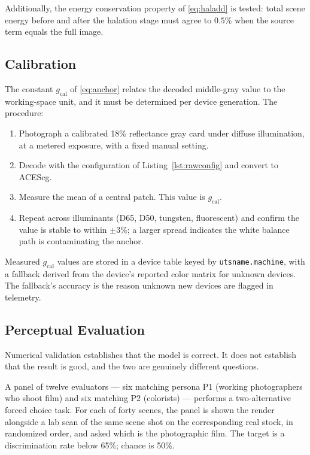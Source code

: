 Additionally, the energy conservation property of \eqref{eq:haladd} is tested:
total scene energy before and after the halation stage must agree to $0.5\%$
when the source term equals the full image.

\subsection{Calibration}
\label{sec:calibration}

The constant $g_{\mathrm{cal}}$ of \eqref{eq:anchor} relates the decoded
middle-gray value to the working-space unit, and it must be determined per
device generation. The procedure:

\begin{enumerate}
\item Photograph a calibrated 18\% reflectance gray card under diffuse
illumination, at a metered exposure, with a fixed manual setting.
\item Decode with the configuration of Listing~\ref{lst:rawconfig} and convert
to ACEScg.
\item Measure the mean of a central patch. This value is
$g_{\mathrm{cal}}$.
\item Repeat across illuminants (D65, D50, tungsten, fluorescent) and confirm
the value is stable to within $\pm 3\%$; a larger spread indicates the white
balance path is contaminating the anchor.
\end{enumerate}

Measured $g_{\mathrm{cal}}$ values are stored in a device table keyed by
\texttt{utsname.machine}, with a fallback derived from the device's reported
color matrix for unknown devices. The fallback's accuracy is the reason unknown
new devices are flagged in telemetry.

\subsection{Perceptual Evaluation}

Numerical validation establishes that the model is correct. It does not
establish that the result is good, and the two are genuinely different
questions.

A panel of twelve evaluators --- six matching persona P1 (working
photographers who shoot film) and six matching P2 (colorists) --- performs a
two-alternative forced choice task. For each of forty scenes, the panel is shown
the \EM{} render alongside a lab scan of the same scene shot on the
corresponding real stock, in randomized order, and asked which is the
photographic film. The target is a discrimination rate below 65\%; chance is
50\%.

